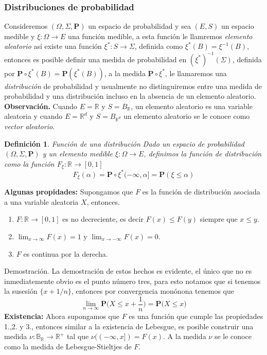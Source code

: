 \documentclass[letterpaper]{article}
\newtheorem{def.}{Definici\'on}[section]
\newcommand{\prob}{\textbf{P}}
\newcommand{\obs}{{\newline \noindent \sc \textbf{Observación. }}}
\newcommand{\dem}{{\noindent \sc Demostraci\'on. }}
\newcommand{\om}{\ensuremath{\Omega}}
\newcommand{\sig}{\ensuremath{\Sigma}}
\newcommand{\re}{\ensuremath{\mathbb R }}
\begin{document}
\subsubsection{Distribuciones de probabilidad}
\label{sec:orgd366427}
\noindent Consideremos \((\om,\sig,\prob)\) un espacio de probabilidad y sea \((E,S)\) un espacio medible y \(\xi:\om\rightarrow E\) una función medible, a esta función le llamremos \emph{elemento aleatorio} así existe una función \(\xi^{*}:S\rightarrow\sig\), definida como \(\xi^{*}(B)=\xi^{-1}(B)\), entonces es posible definir una medida de probabilidad en \((\xi^{*})^{-1}(\sig)\), definida por \(\prob\circ\xi^{*}(B)=\prob(\xi^{*}(B))\), a la medida \(\prob\circ\xi^{*}\), le llamaremos una \emph{distribución} de probabilidad y usualmente no distinguiremos entre una medida de probabilidad y una distribución incluso en la absencia de un elemento aleatorio.
\obs Cuando \(E=\re\) y \(S=B_{\re}\), un elemento aleatorio es una variable aleatoria y cuando \(E=\re^{d}\) y \(S=B_{\re^{d}}\) un elemento aleatorio se le conoce como \emph{vector aleatorio}.
\begin{def.}{Función de una distribución}
Dado un espacio de probabilidad \((\om,\sig,\prob)\) y un elemento medible \(\xi:\om\rightarrow E\), definimos la \textit{función} de distribución como la función \(F_{\xi}:\re\rightarrow[0,1]\)
\[
    F_{\xi}(\alpha)=\prob\circ\xi^{*}(-\infty,\alpha]=\prob(\xi\leq\alpha)
\]
\end{def.}
\noindent \textbf{Algunas propidades:} Supongamos que \(F\) es la función de distribución asociada a una variable aleatoria \(X\), entonces.
\begin{enumerate}
\item \(F:\re\rightarrow[0,1]\) es no decreciente, es decir \(F(x)\leq F(y)\) siempre que \(x\leq y\).
\item \(\lim_{x\rightarrow\infty}F(x)=1\) y \(\lim_{x\rightarrow -\infty}F(x)=0\).
\item \(F\) es continua por la derecha.
\end{enumerate}
\dem La demostración de estos hechos es evidente, el único que no es inmediatemente obvio es el punto número tres, para esto notamos que si tenemos la susesión \(\{x+1/n\}\), entonces por convergencia monónona tenemos que
\[
    \lim_{n\rightarrow\infty}\prob\Big(X\leq x+\frac{1}{n}\Big)=\prob\Big(X\leq x\Big)
\]
\noindent \textbf{Existencia:} Ahora supongamos que \(F\) es una función que cumple las propiedades 1.,2. y 3., entonces similar a la existencia de Lebesgue, es posible construir una medida \(\nu:\mathbb{B}_{\re}\rightarrow\re^{+}\) tal que \(\nu((-\infty,x])=F(x)\). A la medida \(\nu\) se le conoce como la medida de Lebesgue-Stieltjes de \(F\).
\end{document}
